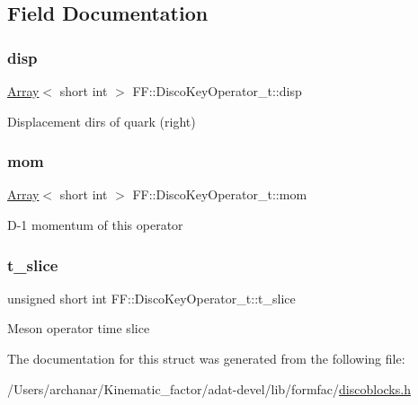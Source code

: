 \subsection{Field Documentation}
\mbox{\label{structFF_1_1DiscoKeyOperator__t_a7d29368ccd597248408ac26bf3470e4b}} 
\subsubsection{\texorpdfstring{disp}{disp}}
{\footnotesize\ttfamily \mbox{\hyperlink{classXMLArray_1_1Array}{Array}}$<$ short int $>$ F\+F\+::\+Disco\+Key\+Operator\+\_\+t\+::disp}

Displacement dirs of quark (right) \mbox{\label{structFF_1_1DiscoKeyOperator__t_a116d34044c3a792c86bf02e2097823f4}} 
\subsubsection{\texorpdfstring{mom}{mom}}
{\footnotesize\ttfamily \mbox{\hyperlink{classXMLArray_1_1Array}{Array}}$<$ short int $>$ F\+F\+::\+Disco\+Key\+Operator\+\_\+t\+::mom}

D-\/1 momentum of this operator \mbox{\label{structFF_1_1DiscoKeyOperator__t_aa9e2b29ba80312c80aa53346f34ce150}} 
\subsubsection{\texorpdfstring{t\_slice}{t\_slice}}
{\footnotesize\ttfamily unsigned short int F\+F\+::\+Disco\+Key\+Operator\+\_\+t\+::t\+\_\+slice}

Meson operator time slice 

The documentation for this struct was generated from the following file\+:\begin{DoxyCompactItemize}
\item 
/\+Users/archanar/\+Kinematic\+\_\+factor/adat-\/devel/lib/formfac/\mbox{\hyperlink{adat-devel_2lib_2formfac_2discoblocks_8h}{discoblocks.\+h}}\end{DoxyCompactItemize}
